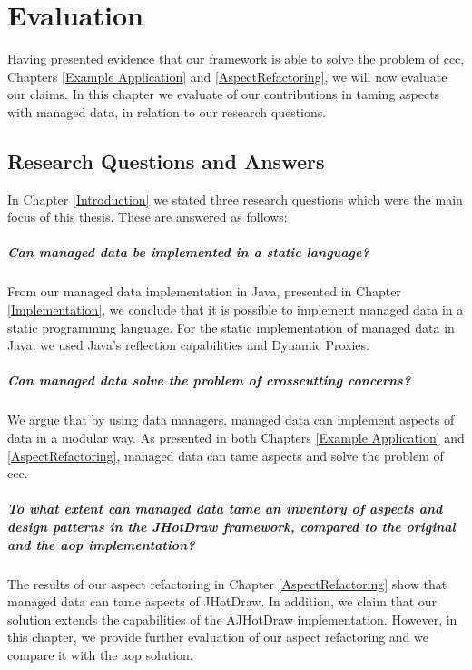 
\chapter{Evaluation}\label{Evaluation}

Having presented evidence that our framework is able to solve the problem of \ac{ccc}, Chapters \ref{Example Application} and \ref{AspectRefactoring}, we will now evaluate our claims.
In this chapter we evaluate of our contributions in taming aspects with managed data, in relation to our research questions.

\section{Research Questions and Answers}\label{Research Questions and Answers}
In Chapter \ref{Introduction} we stated three research questions which were the main focus of this thesis.
These are answered as follows:

\paragraph{Can managed data be implemented in a static language?}
From our managed data implementation in Java, presented in Chapter \ref{Implementation}, we conclude that it is possible to implement managed data in a static programming language.
For the static implementation of managed data in Java, we used Java's reflection capabilities and Dynamic Proxies.

\paragraph{Can managed data solve the problem of crosscutting concerns?}
We argue that by using data managers, managed data can implement aspects of data in a modular way.
As presented in both Chapters \ref{Example Application} and \ref{AspectRefactoring}, managed data can tame aspects and solve the problem of \acrlong{ccc}.

\paragraph{To what extent can managed data tame an inventory of aspects and design patterns in the JHotDraw framework, compared to the original and the \acrlong{aop} implementation?}
The results of our aspect refactoring in Chapter \ref{AspectRefactoring} show that managed data can tame aspects of JHotDraw. 
In addition, we claim that our solution extends the capabilities of the AJHotDraw implementation.
However, in this chapter, we provide further evaluation of our aspect refactoring and we compare it with the \acrlong{aop} solution.

